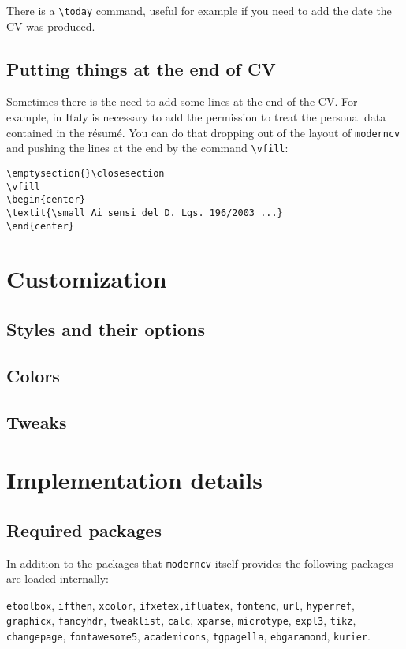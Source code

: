 \documentclass[a4paper,11pt]{article}
\newcommand{\code}[1]{\lstinline!#1!}
\newcommand{\Code}[1]{\lstinline!#1! } %
\newcommand{\Moderncv}{\Code{moderncv}}
\begin{document}
There is a \verb|\today| command, useful for example if you need to add the date the CV was produced.

\subsection*{Putting things at the end of CV}
Sometimes there is the need to add some lines at the end of the CV. For example, in Italy is necessary to add the permission to treat the personal data contained in the r\'esum\'e. You can do that dropping out of the layout of \Code{moderncv} and pushing the lines at the end by the command \verb|\vfill|:
\begin{verbatim}
\emptysection{}\closesection
\vfill
\begin{center} 
\textit{\small Ai sensi del D. Lgs. 196/2003 ...}
\end{center}
\end{verbatim}

\section{Customization}
\label{section:customization}
\subsection{Styles and their options}
\label{section:customization:cvstyles}
\subsection{Colors}
\subsection{Tweaks}

\section{Implementation details}
\label{section:implementationDetails}
\subsection{Required packages}
\label{section:implementationDetails:requiredPackages}
In addition to the packages that \Moderncv itself provides the following packages are loaded internally:

\noindent
\code{etoolbox}, 
\code{ifthen}, 
\code{xcolor}, 
\code{ifxetex,ifluatex}, 
\code{fontenc}, 
\code{url}, 
\code{hyperref}, 
\code{graphicx}, 
\code{fancyhdr}, 
\code{tweaklist}, 
\code{calc}, 
\code{xparse}, 
\code{microtype}, 
\code{expl3}, 
\code{tikz}, 
\code{changepage}, 
\code{fontawesome5}, 
\code{academicons}, 
\code{tgpagella}, %
\code{ebgaramond}, %
\code{kurier}. %
\end{document}
